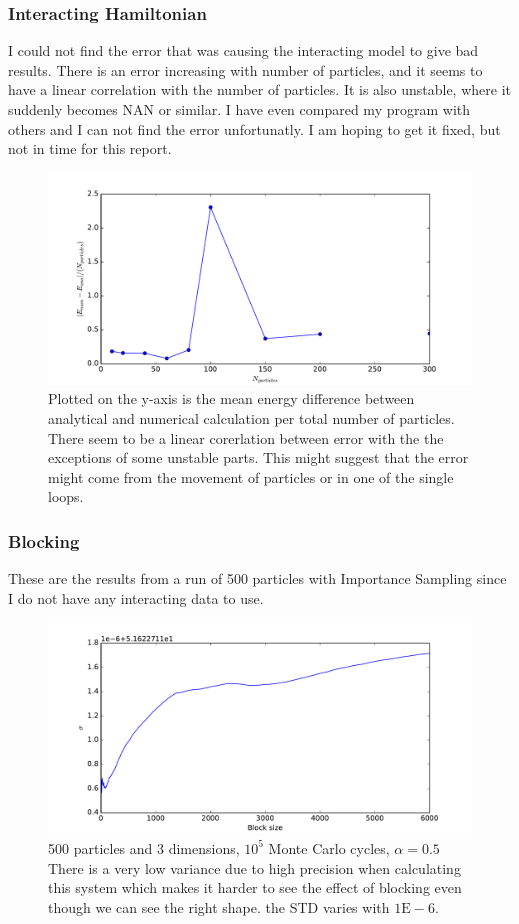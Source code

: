 \documentclass[12pt]{article}
\begin{document}
  \subsubsection{Interacting Hamiltonian}
  I could not find the error that was causing the interacting model to give bad results.
  There is an error increasing with number of particles, and it seems to have a linear
  correlation with the number of particles. It is also unstable, where it suddenly
  becomes NAN or similar. I have even compared my program with others and I can not find the error
  unfortunatly. I am hoping to get it fixed, but not in time for this report.
  \begin{figure}[h!]
    \centering
    \includegraphics[scale=0.6]{graphs/errorana.pdf}
    \caption{Plotted on the y-axis is the mean energy difference between analytical and numerical %
      calculation per total number of particles. There seem to be a linear corerlation between %
      error with the the exceptions of some unstable parts. This might suggest that the error %
      might come from the movement of particles or in one of the single loops.}
  \end{figure}

  \newpage
  \subsubsection{Blocking}
  These are the results from a run of 500 particles with Importance Sampling since I do not have
  any interacting data to use.
  \begin{figure}[h!]
    \centering
    \includegraphics[scale=0.6]{graphs/block.pdf}
    \caption{500 particles and 3 dimensions, $10^5$ Monte Carlo cycles, $\alpha =0.5$%
     There is a very low variance due to high precision when calculating this system which %
      makes it harder to see the effect of blocking even though we can see the right shape. %
    the STD varies with $1\text{E}-6$.}
  \end{figure}
 
\end{document}
